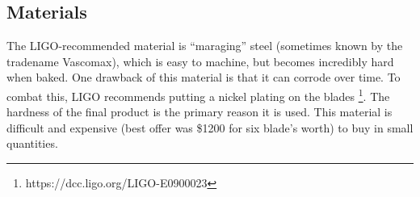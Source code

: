 % 
% 
% 



 
%
%
\subsection{Materials}

The LIGO-recommended material is ``maraging'' steel (sometimes known by the tradename Vascomax), which is easy to machine, but becomes incredibly hard when baked.  One drawback of this material is that it can corrode over time.  To combat this, LIGO recommends putting a nickel plating on the blades \footnote{https://dcc.ligo.org/LIGO-E0900023}.  The hardness of the final product is the primary reason it is used.  This material is difficult and expensive (best offer was \$1200 for six blade's worth) to buy in small quantities.  

